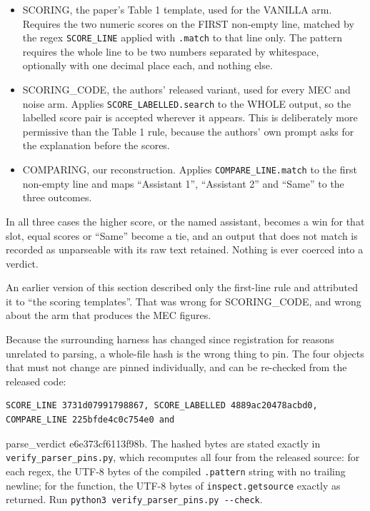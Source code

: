 \begin{itemize}
\tightlist
\item
  SCORING, the paper's Table 1 template, used for the VANILLA arm. Requires the two numeric scores
  on the FIRST non-empty line, matched by the regex \texttt{SCORE\_LINE} applied with \texttt{.match} to that line
  only. The pattern requires the whole line to be two numbers separated by whitespace, optionally
  with one decimal place each, and nothing else.
\item
  SCORING\_CODE, the authors' released variant, used for every MEC and noise arm. Applies
  \texttt{SCORE\_LABELLED.search} to the WHOLE output, so the labelled score pair is accepted wherever it
  appears. This is deliberately more permissive than the Table 1 rule, because the authors' own
  prompt asks for the explanation before the scores.
\item
  COMPARING, our reconstruction. Applies \texttt{COMPARE\_LINE.match} to the first non-empty line and maps
  ``Assistant 1'', ``Assistant 2'' and ``Same'' to the three outcomes.
\end{itemize}

In all three cases the higher score, or the named assistant, becomes a win for that slot, equal
scores or ``Same'' become a tie, and an output that does not match is recorded as unparseable with
its raw text retained. Nothing is ever coerced into a verdict.

An earlier version of this section described only the first-line rule and attributed it to ``the
scoring templates''. That was wrong for SCORING\_CODE, and wrong about the arm that produces the MEC
figures.

Because the surrounding harness has changed since registration for reasons unrelated to parsing, a
whole-file hash is the wrong thing to pin. The four objects that must not change are pinned
individually, and can be re-checked from the released code:

\begin{verbatim}
SCORE_LINE 3731d07991798867, SCORE_LABELLED 4889ac20478acbd0, COMPARE_LINE 225bfde4c0c754e0 and
\end{verbatim}

parse\_verdict e6e373cf6113f98b. The hashed bytes are stated exactly in \texttt{verify\_parser\_pins.py},
which recomputes all four from the released source: for each regex, the UTF-8 bytes of the
compiled \texttt{.pattern} string with no trailing newline; for the function, the UTF-8 bytes of
\texttt{inspect.getsource} exactly as returned. Run \texttt{python3\ verify\_parser\_pins.py\ -\/-check}.

